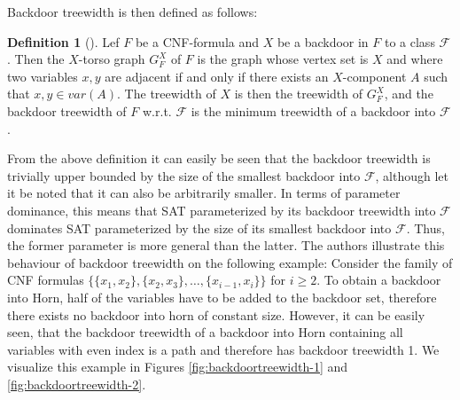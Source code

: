 \documentclass[11pt,a4paper]{article}
\theoremstyle{definition}
\newtheorem{definition}{Definition}[section]
\theoremstyle{proposition}
\begin{document}
 Backdoor treewidth is then defined as follows:
\begin{definition}[{\cite[p.26]{GanianBackdoorTreewidth}}]
Lef $F$ be a CNF-formula and $X$ be a backdoor in $F$ to a class $\mathcal{F}$. Then the $X$-torso graph $G_F^X$ of $F$ is the graph whose vertex set is $X$ and where two variables $x,y$ are adjacent if and only if there exists an $X$-component $A$ such that $x,y \in var(A)$. The treewidth of $X$ is then the treewidth of $G_F^X$, and the backdoor treewidth of $F$ w.r.t. $\mathcal{F}$ is the minimum treewidth of a backdoor into $\mathcal{F}$. 
\end{definition}
From the above definition it can easily be seen that the backdoor treewidth is trivially upper bounded by the size of the smallest backdoor into $\mathcal{F}$, although let it be noted that it can also be arbitrarily smaller. In terms of parameter dominance, this means that SAT parameterized by its backdoor treewidth into $\mathcal{F}$ dominates SAT parameterized by the size of its smallest backdoor into $\mathcal{F}$. Thus, the former parameter is more general than the latter. The authors illustrate this behaviour of backdoor treewidth on the following example: Consider the family of CNF formulas $\{\{x_1, x_2\}, \{x_2, x_3\}, \dots , \{x_{i-1}, x_i\} \}$ for $i \geq 2$. To obtain a backdoor into Horn, half of the variables have to be added to the backdoor set, therefore there exists no backdoor into horn of constant size. However, it can be easily seen, that the backdoor treewidth of a backdoor into Horn containing all variables with even index is a path and therefore has backdoor treewidth 1. We visualize this example in Figures \ref{fig:backdoortreewidth-1} and \ref{fig:backdoortreewidth-2}. 
\end{document}
